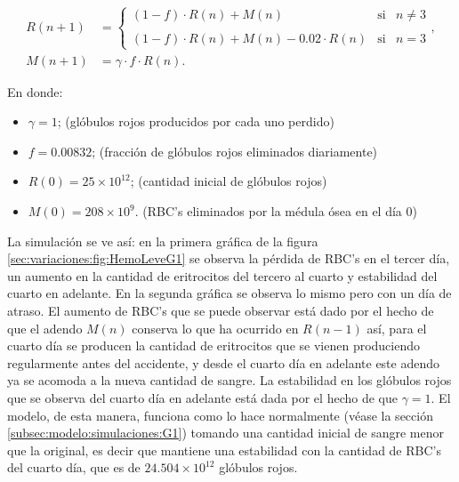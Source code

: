 \begin{align}\label{eq:HemoLeveMal}
    R(n+1) &= \left\{ \begin{array}{lcc} (1-f)\cdot R(n)+M(n) & \textrm{si} & n \neq 3 \\ \\ (1-f)\cdot R(n)+M(n)-0.02\cdot R(n) & \textrm{si} & n = 3\end{array} \right., \\
    M(n+1) &=\gamma \cdot f \cdot R(n). \nonumber
\end{align}

En donde:
\begin{itemize}
    \item $\gamma=1$; (glóbulos rojos producidos por cada uno perdido)
    \item $f=0.00832$; (fracción de glóbulos rojos eliminados diariamente)
    \item $R(0) = 25\times 10^{12}$; (cantidad inicial de glóbulos rojos)
    \item $M(0) = 208 \times 10^{9}$. (RBC's eliminados por la médula ósea en el día 0)
\end{itemize}

La simulación se ve así: en la primera gráfica de la figura \ref{sec:variaciones:fig:HemoLeveG1} se observa la pérdida de RBC's en el tercer día, un aumento en la cantidad de eritrocitos del tercero al cuarto y estabilidad del cuarto en adelante. En la segunda gráfica se observa lo mismo pero con un día de atraso. El aumento de RBC's que se puede observar está dado por el hecho de que el adendo $M(n)$ conserva lo que ha ocurrido en $R(n-1)$ así, para el cuarto día se producen la cantidad de eritrocitos que se vienen produciendo regularmente antes del accidente, y desde el cuarto día en adelante este adendo ya se acomoda a la nueva cantidad de sangre. La estabilidad en los glóbulos rojos que se observa del cuarto día en adelante está dada por el hecho de que $\gamma = 1$. El modelo, de esta manera, funciona como lo hace normalmente (véase la sección \ref{subsec:modelo:simulaciones:G1}) tomando una cantidad inicial de sangre menor que la original, es decir que mantiene una estabilidad con la cantidad de RBC's del cuarto día, que es de $24.504\times 10^{12}$ glóbulos rojos. 

